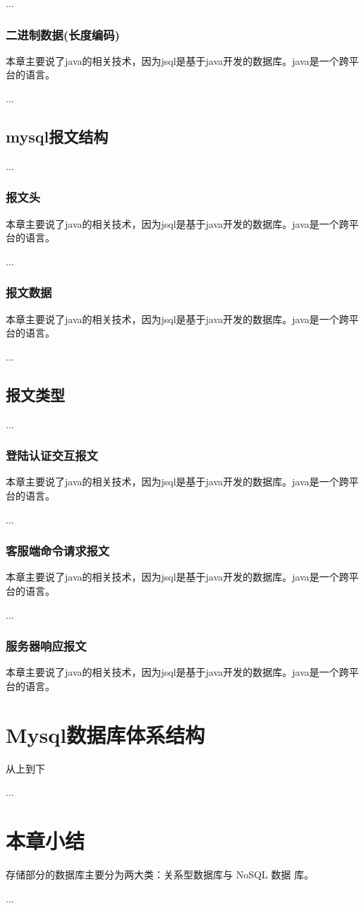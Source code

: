...
\subsubsection*{二进制数据(长度编码)}
本章主要说了java的相关技术，因为jsql是基于java开发的数据库。java是一个跨平台的语言。

...
\subsection{mysql报文结构}
...
\subsubsection*{报文头}
本章主要说了java的相关技术，因为jsql是基于java开发的数据库。java是一个跨平台的语言。

...
\subsubsection*{报文数据}
本章主要说了java的相关技术，因为jsql是基于java开发的数据库。java是一个跨平台的语言。

...
\subsection{报文类型}
...
\subsubsection*{登陆认证交互报文}
本章主要说了java的相关技术，因为jsql是基于java开发的数据库。java是一个跨平台的语言。

...
\subsubsection*{客服端命令请求报文}
本章主要说了java的相关技术，因为jsql是基于java开发的数据库。java是一个跨平台的语言。

...
\subsubsection*{服务器响应报文}
本章主要说了java的相关技术，因为jsql是基于java开发的数据库。java是一个跨平台的语言。

\section{Mysql数据库体系结构}
从上到下

...
\section{本章小结}
存储部分的数据库主要分为两大类：关系型数据库与 NoSQL 数据
库。

...
